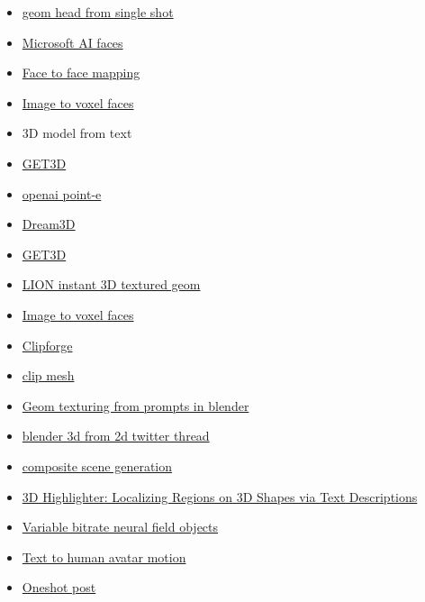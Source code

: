 \begin{itemize}
  \begin{itemize}
   
  \item
    \href{https://samsunglabs.github.io/rome/}{geom head from single
    shot}
  \item
    \href{https://www.youtube.com/watch?v=uboj01Gfy1A}{Microsoft AI
    faces}
  \item
    \href{https://replicate.com/yoyo-nb/thin-plate-spline-motion-model}{Face
    to face mapping}
  \item
    \href{https://katjaschwarz.github.io/voxgraf/}{Image to voxel faces}
  \item
    3D model from text
  \item
    \href{https://nv-tlabs.github.io/GET3D/}{GET3D}
  \item
    \href{https://github.com/openai/point-e}{openai point-e}
  \item
    \href{https://ajayj.com/dreamfields}{Dream3D}
  \item
    \href{https://nv-tlabs.github.io/GET3D/}{GET3D}
  \item
    \href{https://nv-tlabs.github.io/LION/}{LION instant 3D textured
    geom}
  \item
    \href{https://katjaschwarz.github.io/voxgraf/}{Image to voxel faces}
  \item
    \href{https://github.com/autodeskailab/clip-forge}{Clipforge}
  \item
    \href{https://paperswithcode.com/paper/text-to-mesh-without-3d-supervision-using}{clip
    mesh}
  \item
    \href{https://github.com/carson-katri/dream-textures/pull/409}{Geom
    texturing from prompts in blender}
  \item
    \href{https://twitter.com/TomLikesRobots/status/1603884188326940674}{blender
    3d from 2d twitter thread}
  \item
    \href{https://github.com/zoomin-lee/scene-scale-diffusion}{composite
    scene generation}
  \item
    \href{https://threedle.github.io/3DHighlighter/}{3D Highlighter:
    Localizing Regions on 3D Shapes via Text Descriptions}
  \item
    \href{https://nv-tlabs.github.io/vqad/}{Variable bitrate neural
    field objects}
  \item
    \href{https://ofa-sys.github.io/MoFusion/}{Text to human avatar
    motion}
  \item
    \href{https://zju3dv.github.io/onepose_plus_plus/}{Oneshot post
}
\end{itemize}
\end{itemize}
